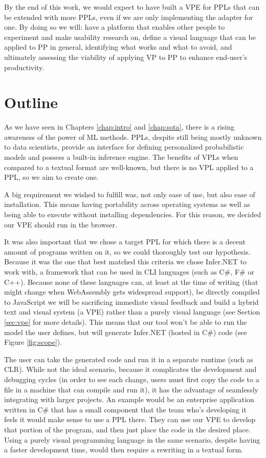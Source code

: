 By the end of this work, we would expect to have built a VPE for PPLs that can
be extended with more PPLs, even if we are only implementing the adapter for one.
By doing so we will: have a platform that enables other people to experiment
and make usability research on, define a visual language that can be applied to PP in general,
identifying what works and what to avoid,
and ultimately assessing the viability of applying VP to PP to enhance end-user's
productivity.

\section{Outline}

As we have seen in Chapters \ref{chap:intro} and \ref{chap:sota}, there is a
rising awareness of the power of ML methods. PPLs, despite still being mostly
unknown to data scientists, provide an interface for defining personalized
probabilistic models and possess a built-in inference engine.
The benefits of VPLs when compared to a textual format are well-known, but there
is no VPL applied to a PPL, so we aim to create one.

A big requirement we wished to fulfill was, not only ease of use, but also ease
of installation. This means having portability across operating systems as well
as being able to execute without installing dependencies. For this reason, we
decided our VPE should run in the browser.

It was also important that we chose
a target PPL for which there is a decent amount of programs written on it, so we
could thoroughly test our hypothesis. Because it was the one
that best matched this criteria we chose Infer.NET to work with, a framework that
can be used in CLI languages (such as C#, F# or C++). Because none of these
languages can, at least at the time of writing (that might change when WebAssembly
\cite{weba} gets widespread support), be directly compiled to JavaScript
we will be sacrificing immediate
visual feedback and build a hybrid text and visual system (a VPE) rather than a purely
visual language (see Section \ref{sec:vpe} for more details). This means that
our tool won't be able to run the model the user defines, but will generate
Infer.NET (hosted in C#) code (see Figure \ref{fig:scope}).

The user can take the generated
code and run it in a separate runtime (such as CLR). While not the ideal scenario, because it
complicates the development and debugging cycles (in order to see each change,
users must first copy the code to a file in a machine that can compile and run it),
it has the advantage of seamlessly integrating with larger projects. An example
would be an enterprise application written in C# that has a small component
that the team who's developing it feels it would make sense to use a PPL there.
They can use our VPE to develop that portion of the program, and then just place
the code in the desired place. Using a purely visual programming language in the
same scenario, despite having a faster development time, would then require
a rewriting in a textual form.


